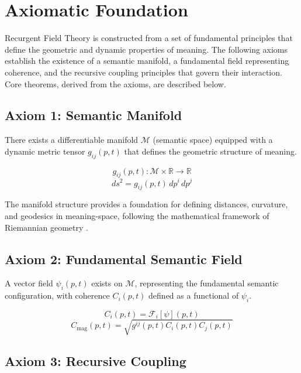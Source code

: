\chapter{Axiomatic Foundation}

Recurgent Field Theory is constructed from a set of fundamental principles that define the geometric and dynamic properties of meaning. The following axioms establish the existence of a semantic manifold, a fundamental field representing coherence, and the recursive coupling principles that govern their interaction. Core theorems, derived from the axioms, are described below.

\section{Axiom 1: Semantic Manifold}

There exists a differentiable manifold \(\mathcal{M}\) (semantic space) equipped with a dynamic metric tensor \(g_{ij}(p,t)\) that defines the geometric structure of meaning.

\begin{equation}
g_{ij}(p,t) : \mathcal{M} \times \mathbb{R} \rightarrow \mathbb{R}
\end{equation}
\begin{equation}
ds^2 = g_{ij}(p,t) \, dp^i \, dp^j
\end{equation}

The manifold structure provides a foundation for defining distances, curvature, and geodesics in meaning-space, following the mathematical framework of Riemannian geometry \autocite{Riemann1868}.

\section{Axiom 2: Fundamental Semantic Field}

A vector field \(\psi_i(p,t)\) exists on \(\mathcal{M}\), representing the fundamental semantic configuration, with coherence \(C_i(p,t)\) defined as a functional of \(\psi_i\).

\begin{equation}
C_i(p,t) = \mathcal{F}_i[\psi](p,t)
\end{equation}
\begin{equation}
C_{\text{mag}}(p,t) = \sqrt{g^{ij}(p,t) C_i(p,t) C_j(p,t)}
\end{equation}

\section{Axiom 3: Recursive Coupling}

